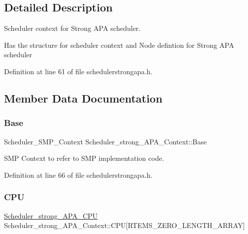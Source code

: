 \subsection{Detailed Description}
Scheduler context for Strong A\+PA scheduler. 

Has the structure for scheduler context and Node defintion for Strong A\+PA scheduler 

Definition at line 61 of file schedulerstrongapa.\+h.



\subsection{Member Data Documentation}
\mbox{\label{structScheduler__strong__APA__Context_a55755b445b7e7beaf1b87b178521e615}} 
\subsubsection{\texorpdfstring{Base}{Base}}
{\footnotesize\ttfamily Scheduler\+\_\+\+S\+M\+P\+\_\+\+Context Scheduler\+\_\+strong\+\_\+\+A\+P\+A\+\_\+\+Context\+::\+Base}



S\+MP Context to refer to S\+MP implementation code. 



Definition at line 66 of file schedulerstrongapa.\+h.

\mbox{\label{structScheduler__strong__APA__Context_afdc7dcc1fef07a07130a8ddde0895e9c}} 
\subsubsection{\texorpdfstring{C\+PU}{CPU}}
{\footnotesize\ttfamily \hyperlink{structScheduler__strong__APA__CPU}{Scheduler\+\_\+strong\+\_\+\+A\+P\+A\+\_\+\+C\+PU} Scheduler\+\_\+strong\+\_\+\+A\+P\+A\+\_\+\+Context\+::\+C\+PU\mbox{[}R\+T\+E\+M\+S\+\_\+\+Z\+E\+R\+O\+\_\+\+L\+E\+N\+G\+T\+H\+\_\+\+A\+R\+R\+AY\mbox{]}}



